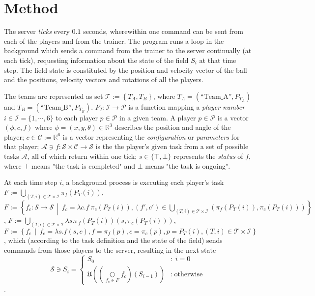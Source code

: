 \documentclass[10pt,a4paper]{article}
\begin{document}
\section{Method}

The server \textit{ticks} every \(0.1\) seconds, wherewithin one command can be sent from each of the players and from the trainer. The program runs a loop in the background which sends a command from the trainer to the server continually (at each tick), requesting information about the state of the field \(S_i\) at that time step. The field state is constituted by the position and velocity vector of the ball and the positions, velocity vectors and rotations of all the players.

The teams are represented as set \(\mathcal{T} := \left\{ T_A, T_B \right\}\), where \(T_A = (\text{``Team\_A''}, P_{T_A})\) and \(T_B = (\text{``Team\_B''}, P_{T_B})\). \(P_T : \mathcal{I} \to \mathcal{P} \) is a function mapping a \textit{player number} \(i\in \mathcal{I} = \{1,\cdots,6\}\) to each player \(p \in \mathcal{P}\) in a given team. A player \(p\in \mathcal{P}\) is a vector \((\phi, c, f)\) where \(\phi = (x, y, \theta) \in \mathbb{R}^3\) describes the position and angle of the player; \(c \in \mathcal{C} := \mathbb{R}^6\) is a vector representing the \textit{configuration} or \textit{parameters} for that player; \(\mathcal{A} \ni f:\mathcal{S}\times \mathcal{C} \to \mathcal{S}\) is the the player's given task from a set of possible tasks \(\mathcal{A}\), all of which return within one tick; \(s \in \{\top,\bot\}\) represents the \textit{status} of \(f\), where \(\top\) means "the task is completed" and \(\bot\) means "the task is ongoing".

At each time step \(i\), a background process is executing each player's task \(F := \bigcup_{(T,i)\in\mathcal{T} \times \mathcal{I}} \pi_f(P_T(i)) \), \(F := \left\{ f_c:\mathcal{S}\to\mathcal{S} \,\middle|\, f_c = \lambda c.f\ \pi_c(P_T(i)), (f', c') \in \bigcup_{(T,i)\in\mathcal{T} \times \mathcal{I}} ( \pi_f(P_T(i)), \pi_c(P_T(i))) \right\}\), \(F := \bigcup_{(T,i)\in\mathcal{T} \times \mathcal{I}} \lambda s.\pi_f(P_T(i))(s, \pi_c(P_T(i))) \), 
\[
		F := \left\{ f_c \,\middle|\, f_c = \lambda s.f(s, c), f = \pi_f(p), c = \pi_c(p), p = P_T(i), (T,i)\in\mathcal{T} \times \mathcal{I}  \right\}
\]
, which (according to the task definition and the state of the field) sends commands from those players to the server, resulting in the next state 
\[
		\mathcal{S} \ni S_{i} = \left\{
			\begin{array}{cl}
				S_0 & : \ i = 0 \\
					\mathfrak{U} \left( \left(\underset{f_c\in F}\bigcirc f_c\right)(S_{i-1}) \right) & : \ \text{otherwise}
			\end{array}
		\right.
\].
\end{document}
